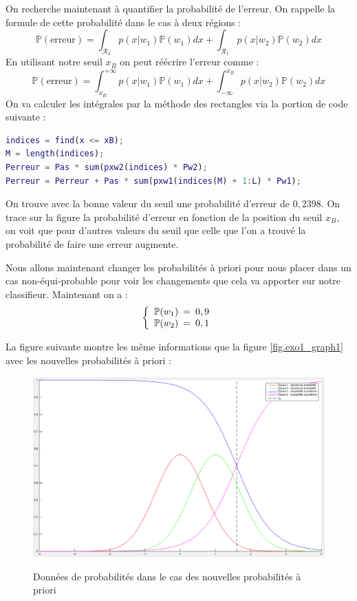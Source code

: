 \documentclass[11pt,a4paper]{article}
\begin{document}
On recherche maintenant à quantifier la probabilité de l'erreur. On rappelle la formule de cette probabilité dans le cas à deux régions :
\begin{equation}
\mathbb{P}(\text{erreur}) = \int_{\mathcal{R}_2}p(x|w_1)\mathbb{P}(w_1)dx + \int_{\mathcal{R}_1}p(x|w_2)\mathbb{P}(w_2)dx
\end{equation}
En utilisant notre seuil $x_B$ on peut réécrire l'erreur comme :
$$
\mathbb{P}(\text{erreur}) = \int_{x_B}^{+\infty}p(x|w_1)\mathbb{P}(w_1)dx + \int_{-\infty}^{x_B}p(x|w_2)\mathbb{P}(w_2)dx
$$
On va calculer les intégrales par la méthode des rectangles via la portion de code suivante :

\noindent\hrulefill
\begin{lstlisting}[language=matlab]
indices = find(x <= xB);
M = length(indices);
Perreur = Pas * sum(pxw2(indices) * Pw2);
Perreur = Perreur + Pas * sum(pxw1(indices(M) + 1:L) * Pw1);
\end{lstlisting}
\noindent\hrulefill

On trouve avec la bonne valeur du seuil une probabilité d'erreur de $0,2398$. On trace sur la figure  la probabilité d'erreur en fonction de la position du seuil $x_B$, on voit que pour d'autres valeurs du seuil que celle que l'on a trouvé la probabilité de faire une erreur augmente.

Nous allons maintenant changer les probabilités à priori pour nous placer dans un cas non-équi-probable pour voir les changements que cela va apporter sur notre classifieur. Maintenant on a :
$$
\left \{
\begin{array}{c @{\,\,\,=\,\,\,} c}
    \mathbb{P}(w_1) & 0,9\\
    \mathbb{P}(w_2) & 0,1
\end{array}
\right.
$$

La figure suivante montre les même informations que la figure \ref{fig.exo1_graph1} avec les nouvelles probabilités à priori :

\begin{figure}[H]
\center
\includegraphics[width=15cm]{exo1_graph_nvProbas.png}
\label{fig.exo1_graph_nvProbas}
\caption{Données de probabilités dans le cas des nouvelles probabilités à priori}
\end{figure}
\end{document}
